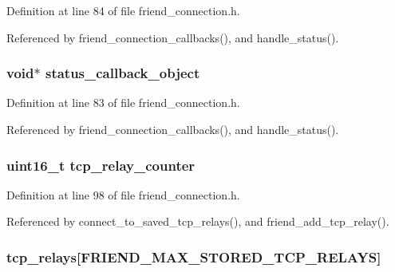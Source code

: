 Definition at line 84 of file friend\+\_\+connection.\+h.



Referenced by friend\+\_\+connection\+\_\+callbacks(), and handle\+\_\+status().

\hypertarget{struct_friend___conn_a73f125475af5ebdac27d2c2a9060039b}{
\subsubsection[{status\+\_\+callback\+\_\+object}]{\setlength{\rightskip}{0pt plus 5cm}void$\ast$ status\+\_\+callback\+\_\+object}}\label{struct_friend___conn_a73f125475af5ebdac27d2c2a9060039b}


Definition at line 83 of file friend\+\_\+connection.\+h.



Referenced by friend\+\_\+connection\+\_\+callbacks(), and handle\+\_\+status().

\hypertarget{struct_friend___conn_aff5cc62447994133f0b5b15e11aa92ed}{
\subsubsection[{tcp\+\_\+relay\+\_\+counter}]{\setlength{\rightskip}{0pt plus 5cm}uint16\+\_\+t tcp\+\_\+relay\+\_\+counter}}\label{struct_friend___conn_aff5cc62447994133f0b5b15e11aa92ed}


Definition at line 98 of file friend\+\_\+connection.\+h.



Referenced by connect\+\_\+to\+\_\+saved\+\_\+tcp\+\_\+relays(), and friend\+\_\+add\+\_\+tcp\+\_\+relay().

\hypertarget{struct_friend___conn_ae6c286282d15bfd5ceea7c2d8b19be5d}{
\subsubsection[{tcp\+\_\+relays}]{ tcp\+\_\+relays\mbox{[}{\bf F\+R\+I\+E\+N\+D\+\_\+\+M\+A\+X\+\_\+\+S\+T\+O\+R\+E\+D\+\_\+\+T\+C\+P\+\_\+\+R\+E\+L\+A\+Y\+S}\mbox{]}}}\label{struct_friend___conn_ae6c286282d15bfd5ceea7c2d8b19be5d}


